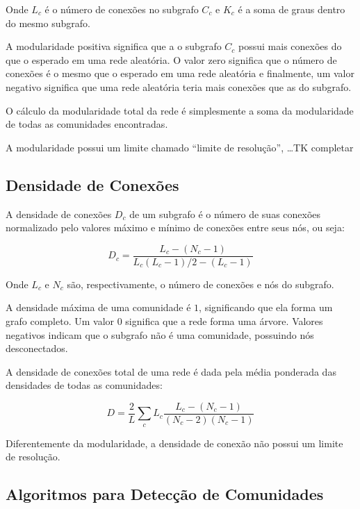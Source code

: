 \documentclass[
  article,
  11pt,
  a4paper,
  english,
  brazil,
  sumario=tradicional]{abntex2}
\begin{document}
Onde $L_c$ é o número de conexões no subgrafo $C_c$ e $K_c$ é a soma de graus dentro do mesmo subgrafo.

A modularidade positiva significa que a o subgrafo $C_c$ possui mais conexões do que o esperado em uma rede aleatória. O valor zero significa que o número de conexões é o mesmo que o esperado em uma rede aleatória e finalmente, um valor negativo significa que uma rede aleatória teria mais conexões que as do subgrafo.

O cálculo da modularidade total da rede é simplesmente a soma da modularidade de todas as comunidades encontradas.

A modularidade possui um limite chamado \enquote{limite de resolução}, \ldots TK completar

\subsection{Densidade de Conexões}

A densidade de conexões $D_c$ de um subgrafo é o número de suas conexões normalizado pelo valores máximo e mínimo de conexões entre seus nós, ou seja:

\begin{equation}
D_c = \frac{L_c - (N_c - 1)}{L_c (L_c - 1) / 2 - (L_c - 1)}
\end{equation}

Onde $L_c$ e $N_c$ são, respectivamente, o número de conexões e nós do subgrafo.

A densidade máxima de uma comunidade é $1$, significando que ela forma um grafo completo. Um valor $0$ significa que a rede forma uma árvore. Valores negativos indicam que o subgrafo não é uma comunidade, possuindo nós desconectados.

A densidade de conexões total de uma rede é dada pela média ponderada das densidades de todas as comunidades:

\begin{equation} \label{eq:densidade-de-conexoes}
D = \frac{2}{L} \sum_c L_c \frac{L_c - (N_c - 1)}{(N_c - 2) (N_c - 1)}
\end{equation}

Diferentemente da modularidade, a densidade de conexão não possui um limite de resolução.

\subsection{Algoritmos para Detecção de Comunidades}
\end{document}

